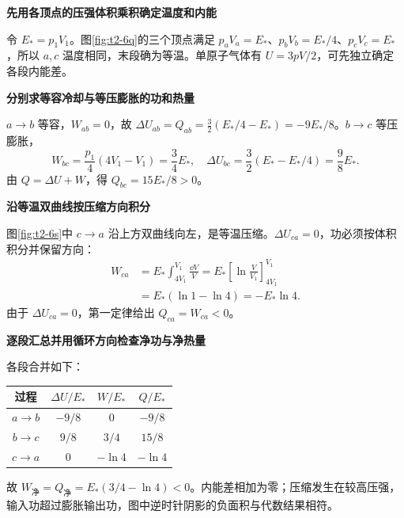 \begin{solution}\textbf{先用各顶点的压强体积乘积确定温度和内能}\par\nobreak
令 $E_*=p_1V_1$。图\ref{fig:t2-6q}的三个顶点满足 $p_aV_a=E_*$、$p_bV_b=E_*/4$、$p_cV_c=E_*$，所以 $a,c$ 温度相同，末段确为等温。单原子气体有 $U=3pV/2$，可先独立确定各段内能差。


\par\medskip{}\noindent\textbf{分别求等容冷却与等压膨胀的功和热量}\par\nobreak
$a\to b$ 等容，$W_{ab}=0$，故 $\Delta U_{ab}=Q_{ab}=\frac32(E_*/4-E_*)=-9E_*/8$。$b\to c$ 等压膨胀，
\[W_{bc}=\frac{p_1}{4}(4V_1-V_1)=\frac34E_*,\quad
\Delta U_{bc}=\frac32(E_*-E_*/4)=\frac98E_*.\]
由 $Q=\Delta U+W$，得 $Q_{bc}=15E_*/8>0$。



\par\medskip{}\noindent\textbf{沿等温双曲线按压缩方向积分}\par\nobreak
图\ref{fig:t2-6s}中 $c\to a$ 沿上方双曲线向左，是等温压缩。$\Delta U_{ca}=0$，功必须按体积积分并保留方向：
\begin{align*}
W_{ca}&=E_*\int_{4V_1}^{V_1}\frac{\dd V}{V}
=E_*\left[\ln\frac V{V_1}\right]_{4V_1}^{V_1}\\
&=E_*(\ln1-\ln4)=-E_*\ln4.
\end{align*}
由于 $\Delta U_{ca}=0$，第一定律给出 $Q_{ca}=W_{ca}<0$。


\par\medskip{}\noindent\textbf{逐段汇总并用循环方向检查净功与净热量}\par\nobreak
各段合并如下：
\begin{center}\small\begin{tabular}{cccc}\toprule 过程&$\Delta U/E_*$&$W/E_*$&$Q/E_*$\\\midrule $a\to b$&$-9/8$&0&$-9/8$\\$b\to c$&$9/8$&$3/4$&$15/8$\\$c\to a$&0&$-\ln4$&$-\ln4$\\\bottomrule\end{tabular}\end{center}
故 $\boxed{W_{\text{净}}=Q_{\text{净}}=E_*(3/4-\ln4)<0}$。内能差相加为零；压缩发生在较高压强，输入功超过膨胀输出功，图中逆时针阴影的负面积与代数结果相符。
\end{solution}
